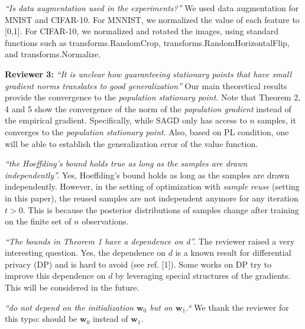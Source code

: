 \documentclass{article}
\begin{document}
\textit{``Is data augmentation used in the experiments?''}
We used data augmentation for MNIST and CIFAR-10. 
For MNNIST, we normalized the value of each feature to [0,1]. 
For CIFAR-10, we normalized and rotated the images, using standard functions such as transforms.RandomCrop, transforms.RandomHorizontalFlip, and transforms.Normalize. \vspace{-5pt}
    


\textbf{Reviewer 3:}
\textit{``It is unclear how guaranteeing stationary points that have small gradient norms translates to good generalization''}
Our main theoretical results provide the convergence to the \emph{population stationary point}. 
Note that Theorem 2, 4 and 5 show the convergence of the norm of the \emph{population gradient} instead of the empirical gradient. 
Specifically, while SAGD only has access to $n$ samples, it converges to the \emph{population stationary point}. 
Also, based on PL condition, one will be able to establish the generalization error of the value function. \vspace{-5pt}
    
\textit{``the Hoeffding's bound holds true as long as the samples are drawn independently''.}
 Yes, Hoeffding's bound holds as long as the samples are drawn independently. 
However, in the setting of optimization with \emph{sample reuse} (setting in this paper), the reused samples are not independent anymore for any iteration $t > 0$. 
This is because the posterior distributions of samples change after training on the finite set of $n$ observations. \vspace{-5pt}
 

 \textit{``The bounds in Theorem 1 have a dependence on d''.}
The reviewer raised a very interesting question.
Yes, the dependence on $d$ is a known result for differential privacy (DP) and is hard to avoid (see ref. [1]). 
Some works on DP try to improve this dependence on $d$ by leveraging special structures of the gradients. 
This will be considered in the future. \vspace{-5pt}
    

\textit{``do not depend on the initialization $\mathbf{w}_0$ but on $\mathbf{w}_1$.``}
We thank the reviewer for this typo: should be $\mathbf{w}_0$ instead of $\mathbf{w}_1$.\vspace{-5pt}
    
\end{document}
